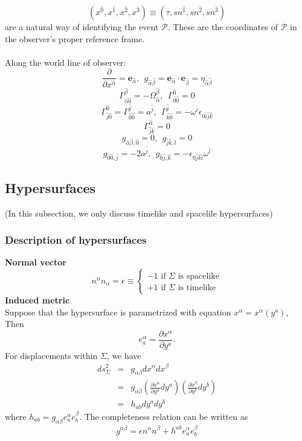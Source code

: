 \documentclass{article}
\begin{document}
\[(x^{\hat{0}},x^{\hat{1}},x^{\hat{2}},x^{\hat{3}}) \equiv (\tau,s n^{\hat{1}},s n^{\hat{2}},s n^{\hat{3}})\]
are a natural way of identifying the event $\mathcal{P}$. These are the coordinates of $\mathcal{P}$ in the observer's proper reference frame.\\ \\
Along the world line of observer:
\[\frac{\partial}{\partial x^{\hat{\alpha}}} = \mathbf{e}_{\hat{\alpha}}, \ \ g_{\hat{\alpha} \hat{\beta}} = \mathbf{e}_{\hat{\alpha}} \cdot \mathbf{e}_{\hat{\beta}} = \eta_{\hat{\alpha}\hat{\beta}}\]
\[\Gamma^{\hat{\beta}}_{\hat{\alpha} \hat{0}} = - \Omega^{\hat{\beta}}_{\hat{\alpha}}, \ \ \Gamma^{\hat{0}}_{\hat{0} \hat{0}} =0\]
\[\Gamma^{\hat{0}}_{\hat{j} \hat{0}} = \Gamma^{\hat{j}}_{\hat{0} \hat{0}} = a^{\hat{j}}, \ \ \Gamma^{\hat{j}}_{\hat{k} \hat{0}} = -\omega^{\hat{i}} \epsilon_{0 \hat{i} \hat{j} \hat{k}} \]
\[\Gamma^{\hat{\alpha}}_{\hat{j} \hat{k}} = 0 \]
\[g_{\hat{\alpha} \hat{\beta},\hat{0}} = 0, \ \ g_{\hat{j} \hat{k},\hat{l}} = 0\]
\[g_{\hat{0} \hat{0},\hat{j}} = -2 a^{\hat{j}}, \ \ g_{\hat{0} \hat{j},\hat{k}} = -\epsilon_{0 \hat{j} \hat{k} \hat{l}} \omega^{\hat{l}}\]

\subsection{Hypersurfaces}
(In this subsection, we only discuss timelike and spacelile hypersurfaces)
\subsubsection{Description of hypersurfaces}
\textbf{Normal vector}\\
\[n^{\alpha}n_{\alpha} = \epsilon \equiv \begin{cases} -1 \mbox{ if  } \Sigma \mbox{ is spacelike}\\ +1 \mbox{ if  } \Sigma \mbox{ is timelike}\end{cases} \]
\textbf{Induced metric}\\
Suppose that the hypersurface is parametrized with equation $x^{\alpha} = x^{\alpha}(y^a)$, Then
\[e_{a}^{\alpha} = \frac{\partial x^{\alpha}}{\partial y^a}.\]
For displacements within $\Sigma$, we have
\begin{eqnarray}
ds_{\Sigma}^{2} &=& g_{\alpha \beta} dx^{\alpha} dx^{\beta} \nonumber \\
&=& g_{\alpha \beta} (\frac{\partial x^{\alpha}}{\partial y^a} dy^a) (\frac{\partial x^{\beta}}{\partial y^b} dy^b) \nonumber \\
&=& h_{ab} dy^a dy^b \nonumber
\end{eqnarray}
where $h_{ab} = g_{\alpha \beta} e_{a}^{\alpha} e_{b}^{\beta}$.
The completeness relation can be written as
\[g^{\alpha \beta} = \epsilon n^{\alpha} n^{\beta} + h^{ab}e_{a}^{\alpha} e_{b}^{\beta} \]
\end{document}
